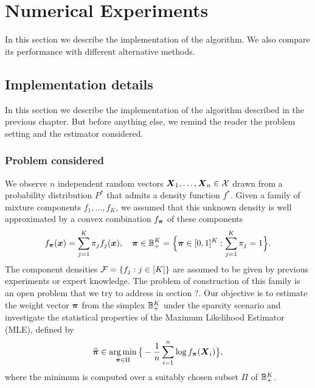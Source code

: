 
\chapter{Numerical Experiments}

In this section we describe the implementation of the algorithm. We also compare its performance with different alternative methods.

\section{Implementation details}

In this section we describe the implementation of the algorithm described in the previous chapter. But before anything else, we remind the reader the problem setting and the estimator considered. 
\subsection{Problem considered}
We observe $n$ independent random vectors $\boldsymbol X_1,\ldots,\boldsymbol X_n\in\mathcal X$ drawn from a probability distribution $P^*$ that admits a density function $f^*$. Given a family of mixture components $f_1,\ldots,f_K$, we assumed that this unknown density is well approximated by a convex combination $f_{\boldsymbol \pi}$ of these components
\begin{equation}
f_{\boldsymbol \pi}(\boldsymbol x)=\sum_{j=1}^K\pi_j f_j(\boldsymbol x), \quad \boldsymbol \pi \in {\mathbb B}_+^K=\Big\{\boldsymbol \pi\in [0,1]^K: \sum_{j=1}^K\pi_j=1\Big\}.
\end{equation}
The component densities $\mathcal F=\{f_j:j\in[K]\}$ are assumed to be given by previous experiments or expert knowledge. The problem of construction of this family is an open problem that we try to address in section ?. Our objective is to estimate the weight vector $\boldsymbol \pi$ from the simplex ${\mathbb B}_+^K$ under the sparsity scenario and investigate the statistical properties of the Maximum Likelihood Estimator (MLE), defined by
\begin{equation}
\label{MLE_2}
\widehat{\boldsymbol \pi} \in \operatorname*{arg\,min}_{\boldsymbol \pi\in \Pi}\big\{-\frac{1}{n}\sum_{i=1}^n\log f_{\boldsymbol \pi}(\boldsymbol X_i)\big\},
\end{equation}
where the minimum is computed over a suitably chosen subset $\Pi$ of ${\mathbb B}_+^K$. 
